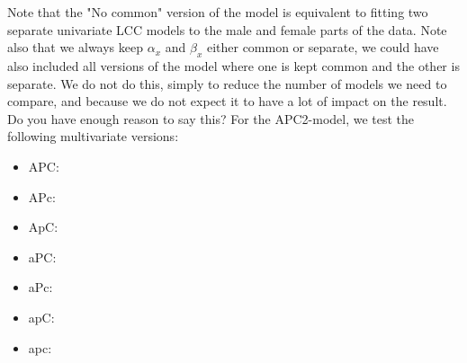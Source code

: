 Note that the "No common" version of the model is equivalent to fitting two separate univariate LCC models to the male and female parts of the data. Note also that we always keep $\alpha_x$ and $\beta_x$ either common or separate, we could have also included all versions of the model where one is kept common and the other is separate. We do not do this, simply to reduce the number of models we need to compare, and because we do not expect it to have a lot of impact on the result. \textcolor{myDarkGreen}{Do you have enough reason to say this? }
For the APC2-model, we test the following multivariate versions:
\begin{itemize}
    \item APC:
    \item APc:
    \item ApC:
    \item aPC: 
    \item aPc:
    \item apC:
    \item apc:
\end{itemize}

